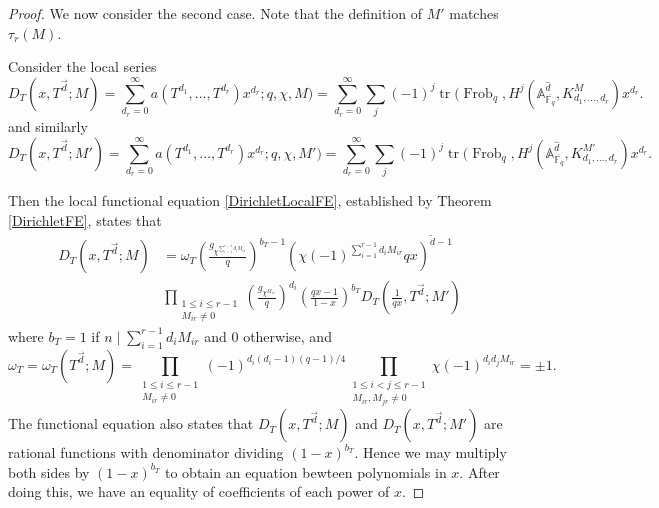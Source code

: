 \documentclass[11pt,letterpaper]{article}
\theoremstyle{definition}
\theoremstyle{remark}
\numberwithin{equation}{section}
\theoremstyle{dotless}
\renewcommand{\tilde}{\widetilde}
\begin{document}
\begin{proof}
We now consider the second case. Note that the definition of $M'$ matches $\tau_r(M)$. 

Consider the local series
\begin{equation} D_T ( x, T^{\vec{d}}; M  ) = \sum_{d_r=0}^\infty  a ( T^{d_1},\dots, T^{d_{r}})  x^{d_r } ; q, \chi, M) =\sum_{d_r=0}^\infty \sum_{j} (-1)^j \operatorname{tr}( \operatorname{Frob}_q, H^j( \mathbb A^{\hat{d}}_{\overline{\mathbb F_q}}, K^{M}_{d_1,\dots,d_{r}})x^{d_r}.\end{equation}
and similarly
\begin{equation} D_T ( x, T^{\vec{d}}; M'  ) = \sum_{d_r=0}^\infty  a ( T^{d_1},\dots, T^{d_{r}})  x^{d_r } ; q, \chi, M') =\sum_{d_r=0}^\infty \sum_{j} (-1)^j \operatorname{tr}( \operatorname{Frob}_q, H^j( \mathbb A^{\hat{d}}_{\overline{\mathbb F_q}}, K^{M'}_{d_1,\dots,d_{r}})x^{d_r}.\end{equation}


Then the local functional equation \eqref{DirichletLocalFE}, established by Theorem \ref{DirichletFE},  states that
\begin{equation} 
\begin{split}
D_{T}(x, T^{\vec{d}}; M  ) &=  \omega_T \left(\frac{g_{\chi^{\sum_{i=1}^{r-1} d_i M_{ir}}}}{q}\right)^{b_{T}-1} (\chi(-1)^{\sum_{i=1}^{r-1} d_i M_{ir}}qx)^{\tilde{d}-1 } \\
&\prod_{\substack{1 \leq i \leq r-1 \\ M_{ir} \neq 0}} \left(\frac{g_{\chi^{M_{ir}}}}{q}\right)^{d_i} \left( \frac{qx-1}{1-x}\right)^{b_{T}} D_{T}(\frac{1}{qx}, T^{\vec{d}}; M')
\end{split}
\end{equation}
where $b_{T}=1$ if $n \mid \sum_{i=1}^{r-1} d_i M_{ir} $ and $0$ otherwise, and 
\begin{equation} 
\omega_T =\omega_T(T^{\vec{d}} ; M)= \prod_{\substack{1 \leq i \leq r-1 \\ M_{ir} \neq 0}} (-1)^{ d_i (d_i-1)(q-1)/4} \prod_{\substack{1 \leq i<j \leq r-1 \\ M_{ir}, M_{jr} \neq 0}} \chi(-1)^{d_i d_j M_{ir} } = \pm 1.
\end{equation}
The functional equation also states that $D_{T}(x, T^{\vec{d}}; M  )$ and $D_{T}(x, T^{\vec{d}}; M'  )$ are rational functions with denominator dividing $(1-x)^{b_T}$. Hence we may multiply both sides by $(1-x)^{b_T}$ to obtain an equation bewteen polynomials in $x$. After doing this, we have an equality of coefficients of each power of $x$.


\end{proof}
\end{document}
